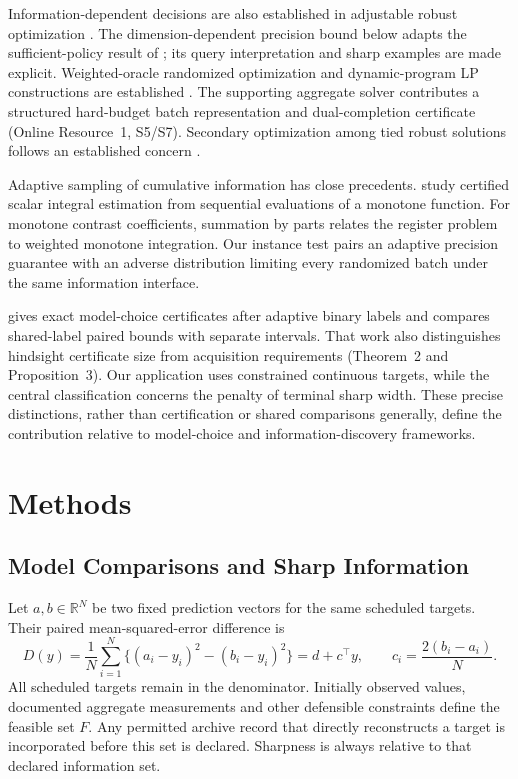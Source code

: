 \documentclass[12pt]{article}
\begin{document}
Information-dependent decisions are also established in adjustable robust
optimization \citep{wei2024,ddid}. The dimension-dependent precision
bound below adapts the sufficient-policy result of
\citet[Theorem~2 and Example~5]{kurtz2026}; its query interpretation and
sharp examples are made explicit. Weighted-oracle randomized optimization
and dynamic-program LP constructions are established
\citep{kawase2024,martin1990}. The supporting aggregate solver contributes
a structured hard-budget batch representation and dual-completion
certificate (Online Resource~1, S5/S7). Secondary optimization among tied
robust solutions follows an established concern \citep{iancu2014}.

Adaptive sampling of cumulative information has close precedents.
\citet[Section~4.1.1, Corollary~1 and Theorem~3]{gaillard2023}
study certified scalar integral estimation from sequential evaluations of
a monotone function. For monotone contrast coefficients, summation by parts
relates the register problem to weighted monotone integration. Our instance
test pairs an adaptive precision guarantee with an adverse distribution
limiting every randomized batch under the same information interface.

\citet[Theorem~1 and Proposition~1]{kuboyama2026} gives exact model-choice
certificates after adaptive binary labels and compares shared-label paired
bounds with separate intervals. That work also distinguishes hindsight
certificate size from acquisition requirements (Theorem~2 and Proposition~3).
Our application uses constrained continuous targets, while the central
classification concerns the penalty of terminal sharp width. These precise
distinctions, rather than certification or shared comparisons generally,
define the contribution relative to model-choice and information-discovery
frameworks.

\section{Methods}\label{sec:methods}
\subsection{Model Comparisons and Sharp Information}
Let $a,b\in\mathbb R^N$ be two fixed prediction vectors for the same
scheduled targets. Their paired mean-squared-error difference is
\begin{equation}
 D(y)=\frac1N\sum_{i=1}^N\{(a_i-y_i)^2-(b_i-y_i)^2\}
 =d+c^\top y,\qquad c_i=\frac{2(b_i-a_i)}N.
 \label{eq:linear}
\end{equation}
All scheduled targets remain in the denominator. Initially observed values,
documented aggregate measurements and other defensible constraints define
the feasible set $F$. Any permitted archive record that directly reconstructs
a target is incorporated before this set is declared. Sharpness is always
relative to that declared information set.
\end{document}
